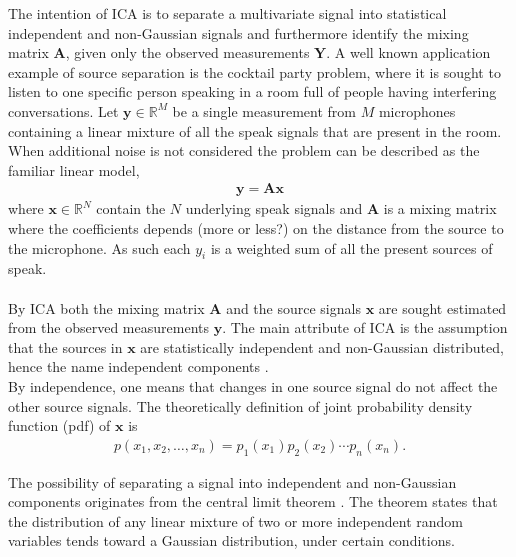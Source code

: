 The intention of ICA is to separate a multivariate signal into statistical independent and non-Gaussian signals and furthermore identify the mixing matrix $\mathbf{A}$, given only the observed measurements $\mathbf{Y}$.
A well known application example of source separation is the cocktail party problem, where it is sought to listen to one specific person speaking in a room full of people having interfering conversations. 
Let $\mathbf{y} \in \mathbb{R}^M$ be a single measurement from $M$ microphones containing a linear mixture of all the speak signals that are present in the room. 
When additional noise is not considered the problem can be described as the familiar linear model, 
\begin{align}\label{eq:ICA1}
\mathbf{y} = \mathbf{Ax}
\end{align}
where $\mathbf{x}\in \mathbb{R}^N$ contain the $N$ underlying speak signals and $\mathbf{A}$ is a mixing matrix where the coefficients depends (more or less?) on the distance from the source to the microphone. 
As such each $y_i$ is a weighted sum of all the present sources of speak.
\\ \\
By ICA both the mixing matrix $\mathbf{A}$ and the source signals $\mathbf{x}$ are sought estimated from the observed measurements $\mathbf{y}$. 
The main attribute of ICA is the assumption that the sources in $\mathbf{x}$ are statistically independent and non-Gaussian distributed, hence the name independent components .
\\     
By independence, one means that changes in one source signal do not affect the other source signals. 
The theoretically definition of joint probability density function (pdf) of $\mathbf{x}$ is
\begin{align*}
p(x_1, x_2, \dots, x_n) = p_1(x_1) p_2(x_2) \cdots p_n(x_n).
\end{align*}


The possibility of separating a signal into independent and non-Gaussian components originates from the central limit theorem \cite[p. 34]{ICA}. 
The theorem states that the distribution of any linear mixture of two or more independent random variables tends toward a Gaussian distribution, under certain conditions. 

